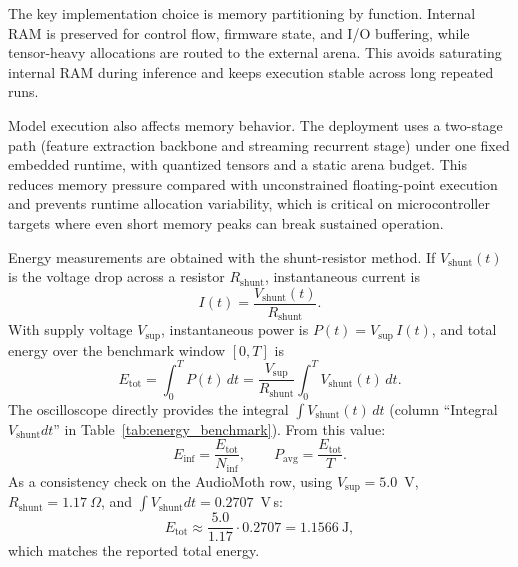 \documentclass[a4paper,singleside,12pt]{report} %
\begin{document}
	The key implementation choice is memory partitioning by function. Internal RAM is preserved for control flow, firmware state, and I/O buffering, while tensor-heavy allocations are routed to the external arena. This avoids saturating internal RAM during inference and keeps execution stable across long repeated runs.

	Model execution also affects memory behavior. The deployment uses a two-stage path (feature extraction backbone and streaming recurrent stage) under one fixed embedded runtime, with quantized tensors and a static arena budget. This reduces memory pressure compared with unconstrained floating-point execution and prevents runtime allocation variability, which is critical on microcontroller targets where even short memory peaks can break sustained operation.

	Energy measurements are obtained with the shunt-resistor method. If \(V_{\mathrm{shunt}}(t)\) is the voltage drop across a resistor \(R_{\mathrm{shunt}}\), instantaneous current is
	\begin{equation}
		I(t)=\frac{V_{\mathrm{shunt}}(t)}{R_{\mathrm{shunt}}}.
	\end{equation}
	With supply voltage \(V_{\mathrm{sup}}\), instantaneous power is \(P(t)=V_{\mathrm{sup}}\,I(t)\), and total energy over the benchmark window \([0,T]\) is
	\begin{equation}
		E_{\mathrm{tot}}=\int_0^T P(t)\,dt=\frac{V_{\mathrm{sup}}}{R_{\mathrm{shunt}}}\int_0^T V_{\mathrm{shunt}}(t)\,dt.
	\end{equation}
	The oscilloscope directly provides the integral \(\int V_{\mathrm{shunt}}(t)\,dt\) (column ``Integral \(V_{\mathrm{shunt}}dt\)'' in Table~\ref{tab:energy_benchmark}). From this value:
	\begin{equation}
		E_{\mathrm{inf}}=\frac{E_{\mathrm{tot}}}{N_{\mathrm{inf}}},\qquad
		P_{\mathrm{avg}}=\frac{E_{\mathrm{tot}}}{T}.
	\end{equation}
	As a consistency check on the AudioMoth row, using \(V_{\mathrm{sup}}=5.0\)~V, \(R_{\mathrm{shunt}}=1.17~\Omega\), and \(\int V_{\mathrm{shunt}}dt=0.2707\)~V\,s:
	\[
		E_{\mathrm{tot}}\approx \frac{5.0}{1.17}\cdot 0.2707 = 1.1566~\mathrm{J},
	\]
	which matches the reported total energy.
\end{document}
